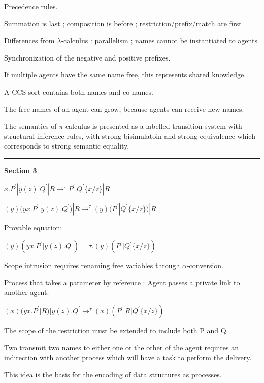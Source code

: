 \documentclass[a4paper]{article}
\begin{document}
Precedence rules.

Summation is last ; composition is before ; restriction/prefix/match are first

Differences from $\lambda$-calculus : parallelism ; names cannot be instantiated to agents

Synchronization of the negative and positive prefixes.

If multiple agents have the same name free, this represents shared knowledge.

A CCS sort contains both names and co-names.

The free names of an agent can grow, because agents can receive new names.

The semantics of $\pi$-calculus is presented as a labelled transition system with structural inference rules, with strong bisimulatoin and strong equivalence which corresponds to strong semantic equality.

\hrule
\textbf{Section 3}

$\bar x.P^\prime|y(z).Q^\prime|R\to^{\tau}P^\prime|Q^\prime\{x/z\}|R$

$(y)(\bar yx.P^\prime|y(z).Q^\prime)|R\to^{\tau}(y)(P^\prime|Q^\prime\{x/z\})|R$

Provable equation:

$(y)(\bar yx.P^\prime|y(z).Q^\prime)=\tau.(y)(P^\prime|Q^\prime\{x/z\})$

Scope intrusion requires renaming free variables through $\alpha$-conversion.

Process that takes a parameter by reference : Agent passes a private link to another agent.

$(x)(\bar yx.P^\prime|R)|y(z).Q^\prime\to^{\tau}(x)(P^\prime|R|Q^\prime\{x/z\})$

The scope of the restriction must be extended to include both P and Q.

Two transmit two names to either one or the other of the agent requires an indirection with another process which will have a task to perform the delivery.

This idea is the basis for the encoding of data structures as processes.
\end{document}
